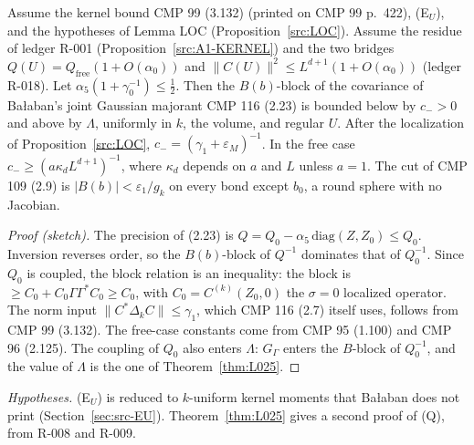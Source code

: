 \begin{proposition}\label{src:Q}
Assume the kernel bound CMP 99 (3.132) (printed on CMP 99 p.~422), (E$_U$), and the hypotheses of Lemma LOC (Proposition~\ref{src:LOC}). Assume the residue of ledger R-001 (Proposition~\ref{src:A1-KERNEL}) and the two bridges $Q(U)=Q_{\mathrm{free}}(1+O(\alpha_0))$ and $\|C(U)\|^2\le L^{d+1}(1+O(\alpha_0))$ (ledger R-018). Let $\alpha_5(1+\gamma_0^{-1})\le\frac12$. Then the $B(b)$-block of the covariance of Ba{\l}aban's joint Gaussian majorant CMP 116 (2.23) is bounded below by $c_->0$ and above by $\Lambda$, uniformly in $k$, the volume, and regular $U$. After the localization of Proposition~\ref{src:LOC}, $c_-=(\gamma_1+\varepsilon_M)^{-1}$. In the free case $c_-\ge(a\kappa_dL^{d+1})^{-1}$, where $\kappa_d$ depends on $a$ and $L$ unless $a=1$. The cut of CMP 109 (2.9) is $|B(b)|<\varepsilon_1/g_k$ on every bond except $b_0$, a round sphere with no Jacobian.
\end{proposition}
\begin{proof}[Proof (sketch)]
The precision of (2.23) is $Q=Q_0-\alpha_5\,\mathrm{diag}(Z,Z_0)\le Q_0$. Inversion reverses order, so the $B(b)$-block of $Q^{-1}$ dominates that of $Q_0^{-1}$. Since $Q_0$ is coupled, the block relation is an inequality: the block is $\ge C_0+C_0\Gamma\Gamma^*C_0\ge C_0$, with $C_0=C^{(k)}(Z_0,0)$ the $\sigma=0$ localized operator. The norm input $\|C^*\Delta_kC\|\le\gamma_1$, which CMP 116 (2.7) itself uses, follows from CMP 99 (3.132). The free-case constants come from CMP 95 (1.100) and CMP 96 (2.125). The coupling of $Q_0$ also enters $\Lambda$: $G_\Gamma$ enters the $B$-block of $Q_0^{-1}$, and the value of $\Lambda$ is the one of Theorem~\ref{thm:L025}.
\end{proof}
\emph{Hypotheses.} (E$_U$) is reduced to $k$-uniform kernel moments that Ba{\l}aban does not print (Section~\ref{sec:src-EU}). Theorem~\ref{thm:L025} gives a second proof of (Q), from R-008 and R-009.

